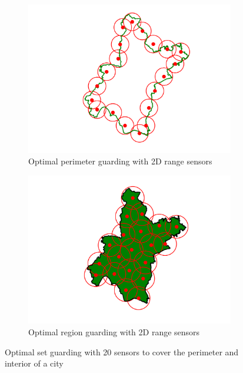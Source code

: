 \begin{figure}[h]
    \centering
    \begin{subfigure}[b]{0.4\textwidth}
        \includegraphics[width = 1.2\textwidth]{chapters/osg/figures/wuhan_ilp.png}
        \caption{Optimal perimeter guarding with 2D range sensors}
        \label{fig:intro-opg2d}
    \end{subfigure}
    \begin{subfigure}[b]{0.4\textwidth}
        \includegraphics[width = 1.2\textwidth]{chapters/osg/figures/wuhan_region_ilp.png}
        \caption{Optimal region guarding with 2D range sensors}
        \label{fig:intro-org2d}
    \end{subfigure}
    \qquad
    \qquad
    \caption{Optimal set guarding with 20 sensors to cover the perimeter and interior of a city}
    \label{fig:intro-osg}
\end{figure}
